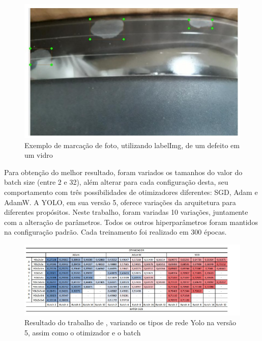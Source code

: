 \begin{figure}[!h]
    \center
    \begin{minipage}{0.6\linewidth}
    \center
    \captionsetup{justification=centering,margin=0.5cm,font=small}
    \includegraphics[width=0.7\linewidth]{img/cap3/mancha-marcacao.jpeg}
    \caption{ Exemplo de marcação de foto, utilizando labelImg, de um defeito em um vidro \cite{gonzaga2023identificaccao}} 
    \label{fig:mancha}
    \end{minipage}
\end{figure}

Para obtenção do melhor resultado, foram variados os tamanhos do valor do batch size (entre 2 e 32), além alterar para cada configuração desta, seu comportamento com três possibilidades de otimizadores diferentes: SGD, Adam e AdamW. A YOLO, em sua versão 5, oferece variações da arquitetura para diferentes propósitos. Neste trabalho, foram variadas 10 variações, juntamente com a alteração de parâmetros. Todos os outros hiperparâmetros foram mantidos na configuração padrão. Cada treinamento foi realizado em 300 épocas.

\begin{figure}[!h]
    \center
    \begin{minipage}{0.9\linewidth}
    \center
    \captionsetup{justification=centering,margin=0.5cm,font=small}
    \includegraphics[width=0.7\linewidth]{img/cap3/tabela-mancha.jpeg}
    \caption{ Resultado do trabalho de \cite{gonzaga2023identificaccao}, variando os tipos de rede Yolo na versão 5, assim como o otimizador e o batch} 
    \label{fig:mancha}
    \end{minipage}
\end{figure}

